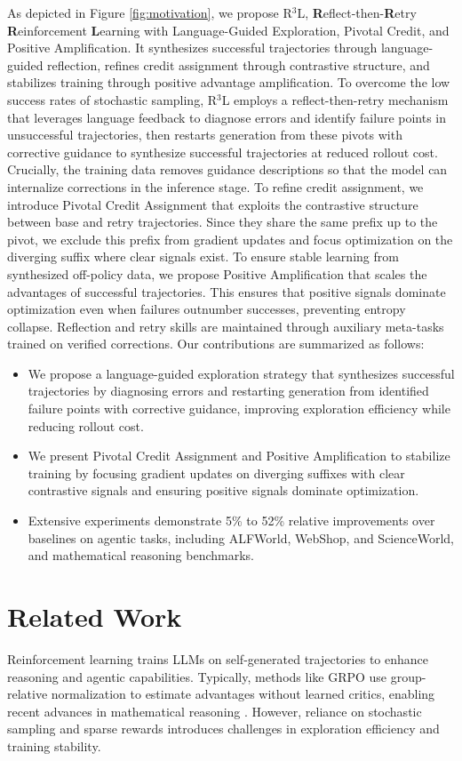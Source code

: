 \documentclass[11pt]{article}
\theoremstyle{definition}
\theoremstyle{remark}
\begin{document}
As depicted in Figure \ref{fig:motivation}, we propose R$^3$L, \textbf{R}eflect-then-\textbf{R}etry \textbf{R}einforcement \textbf{L}earning with Language-Guided Exploration, Pivotal Credit, and Positive Amplification. It synthesizes successful trajectories through language-guided reflection, refines credit assignment through contrastive structure, and stabilizes training through positive advantage amplification. To overcome the low success rates of stochastic sampling, R$^3$L employs a reflect-then-retry mechanism that leverages language feedback to diagnose errors and identify failure points in unsuccessful trajectories, then restarts generation from these pivots with corrective guidance to synthesize successful trajectories at reduced rollout cost. Crucially, the training data removes guidance descriptions so that the model can internalize corrections in the inference stage. To refine credit assignment, we introduce Pivotal Credit Assignment that exploits the contrastive structure between base and retry trajectories. Since they share the same prefix up to the pivot, we exclude this prefix from gradient updates and focus optimization on the diverging suffix where clear signals exist. To ensure stable learning from synthesized off-policy data, we propose Positive Amplification that scales the advantages of successful trajectories. This ensures that positive signals dominate optimization even when failures outnumber successes, preventing entropy collapse. Reflection and retry skills are maintained through auxiliary meta-tasks trained on verified corrections. Our contributions are summarized as follows:
\begin{itemize}
\item We propose a language-guided exploration strategy that synthesizes successful trajectories by diagnosing errors and restarting generation from identified failure points with corrective guidance, improving exploration efficiency while reducing rollout cost.
\item We present Pivotal Credit Assignment and Positive Amplification to stabilize training by focusing gradient updates on diverging suffixes with clear contrastive signals and ensuring positive signals dominate optimization.
\item Extensive experiments demonstrate 5\% to 52\% relative improvements over baselines on agentic tasks, including ALFWorld, WebShop, and ScienceWorld, and mathematical reasoning benchmarks.
\end{itemize}

\section{Related Work}
\label{sec:related_work}
Reinforcement learning trains LLMs on self-generated trajectories to enhance reasoning and agentic capabilities. Typically, methods like GRPO \cite{shao2024deepseekmath} use group-relative normalization to estimate advantages without learned critics, enabling recent advances in mathematical reasoning \cite{guo2025deepseek}. However, reliance on stochastic sampling and sparse rewards introduces challenges in exploration efficiency and training stability.
\end{document}
